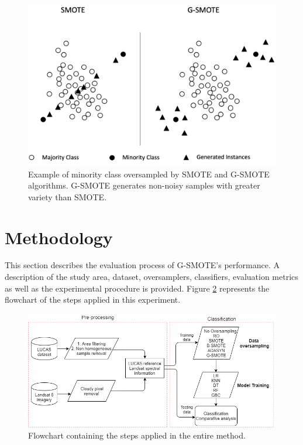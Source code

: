 \documentclass[remotesensing,article,submit,moreauthors,pdftex]{Definitions/mdpi}
\begin{document}
\begin{figure}[H]
	\centering
	\includegraphics[width=1\linewidth]{../analysis/smote_vs_gsmote}
	\caption{Example of minority class oversampled by SMOTE and G-SMOTE
		algorithms. G-SMOTE generates non-noisy samples
		with greater variety than SMOTE.}
	\label{fig:smote_vs_gsmote}
\end{figure}

\section{Methodology}

This section describes the evaluation process of G-SMOTE's performance. A
description of the study area, dataset, oversamplers, classifiers, evaluation
metrics as well as the experimental procedure is provided. Figure
\ref{fig:flowchart} represents the flowchart of the steps applied in this
experiment.

\begin{figure}[H]
	\centering
	\includegraphics[width=1\linewidth]{../analysis/experiment_flow_chart}
	\caption{Flowchart containing the steps applied in the entire method.}
	\label{fig:flowchart}
\end{figure}
\end{document}

